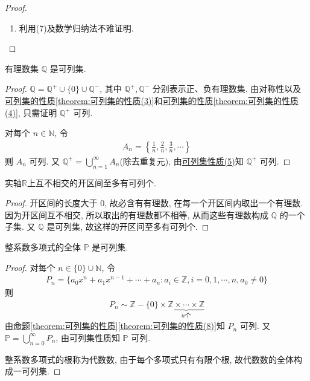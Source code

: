 \documentclass[../../main.tex]{subfiles}%
\begin{document}
\begin{proof}
\begin{enumerate}[(1)]
\item 利用(7)及数学归纳法不难证明.
\end{enumerate}

\end{proof}

\begin{example}
有理数集 $\mathbb{Q}$ 是可列集.
\end{example}
\begin{proof}

$\mathbb{Q} = \mathbb{Q}^+ \cup \{0\} \cup \mathbb{Q}^-$, 其中 $\mathbb{Q}^+, \mathbb{Q}^-$ 分别表示正、负有理数集. 由对称性以及\hyperref[theorem:可列集的性质(3)]{可列集的性质\ref{theorem:可列集的性质(3)}}和\hyperref[theorem:可列集的性质(4)]{可列集的性质\ref{theorem:可列集的性质(4)}}, 只需证明 $\mathbb{Q}^+$ 可列.

对每个 $n \in \mathbb{N}$, 令
\begin{align*}
A_n = \left\{\frac{1}{n}, \frac{2}{n}, \frac{3}{n}, \cdots\right\}
\end{align*}
则 $A_n$ 可列. 又 $\mathbb{Q}^+ = \bigcup_{n = 1}^{\infty} A_n$(除去重复元), 由\hyperref[theorem:可列集的性质]{可列集性质(5)}知 $\mathbb{Q}^+$ 可列.

\end{proof}

\begin{proposition}\label{proposition:实轴上互不相交的开区间至多有可列个}
实轴$\mathbb{R}$上互不相交的开区间至多有可列个.
\end{proposition}
\begin{proof}

开区间的长度大于 $0$, 故必含有有理数, 在每一个开区间内取出一个有理数. 因为开区间互不相交, 所以取出的有理数都不相等, 从而这些有理数构成 $\mathbb{Q}$ 的一个子集. 又 $\mathbb{Q}$ 是可列集, 故这样的开区间至多有可列个.

\end{proof}

\begin{example}
整系数多项式的全体 $\mathbb{P}$ 是可列集.
\end{example}
\begin{proof}

对每个 $n \in \{0\} \cup \mathbb{N}$, 令
\begin{align*}
P_n = \{a_0x^n + a_1x^{n - 1} + \cdots + a_n : a_i \in \mathbb{Z}, i = 0, 1, \cdots, n, a_0 \neq 0\}
\end{align*}
则
\begin{align*}
P_n \sim \mathbb{Z} - \{0\} \times \underbrace{\mathbb{Z} \times \cdots \times \mathbb{Z}}_{n 个}
\end{align*}
由\hyperref[theorem:可列集的性质(8)]{命题\ref{theorem:可列集的性质}\ref{theorem:可列集的性质(8)}}知 $P_n$ 可列. 又 $\mathbb{P} = \bigcup_{n = 0}^{\infty} P_n$, 由可列集性质知 $\mathbb{P}$ 可列.

整系数多项式的根称为代数数, 由于每个多项式只有有限个根, 故代数数的全体构成一可列集.

\end{proof}
\end{document}
